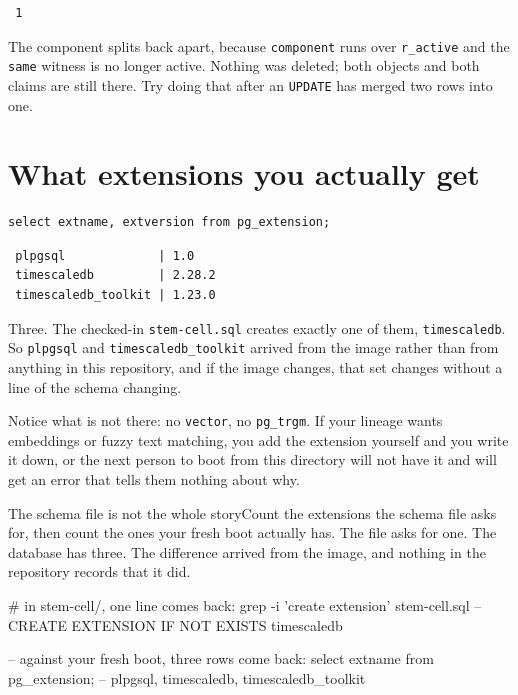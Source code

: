 \begin{verbatim}
 1
\end{verbatim}

The component splits back apart, because \verb|component| runs over \verb|r_active| and the \verb|same| witness is no longer active. Nothing was deleted; both objects and both claims are still there. Try doing that after an \verb|UPDATE| has merged two rows into one.

\section{What extensions you actually get}

\begin{verbatim}
select extname, extversion from pg_extension;
\end{verbatim}

\begin{verbatim}
 plpgsql             | 1.0
 timescaledb         | 2.28.2
 timescaledb_toolkit | 1.23.0
\end{verbatim}

Three. The checked-in \verb|stem-cell.sql| creates exactly one of them, \verb|timescaledb|. So \verb|plpgsql| and \verb|timescaledb_toolkit| arrived from the image rather than from anything in this repository, and if the image changes, that set changes without a line of the schema changing.

Notice what is not there: no \verb|vector|, no \verb|pg_trgm|. If your lineage wants embeddings or fuzzy text matching, you add the extension yourself and you write it down, or the next person to boot from this directory will not have it and will get an error that tells them nothing about why.

\begin{Correspondence}{The schema file is not the whole story}{Count the extensions the schema file asks for, then count the ones your fresh boot actually has.}
The file asks for one. The database has three. The difference arrived from the image, and nothing in the repository records that it did.
\begin{Check}
# in stem-cell/, one line comes back:
grep -i 'create extension' stem-cell.sql
                                     -- CREATE EXTENSION IF NOT EXISTS timescaledb

-- against your fresh boot, three rows come back:
select extname from pg_extension;    -- plpgsql, timescaledb, timescaledb_toolkit
\end{Check}
\end{Correspondence}

